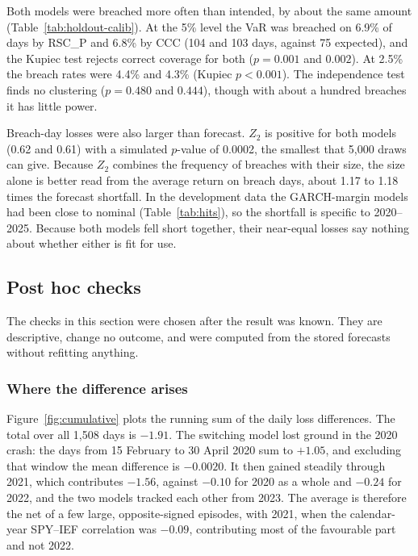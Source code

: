 Both models were breached more often than intended, by about the same amount (Table~\ref{tab:holdout-calib}). At the 5\% level the VaR was breached on 6.9\% of days by RSC\_P and 6.8\% by CCC (104 and 103 days, against 75 expected), and the Kupiec test rejects correct coverage for both ($p=0.001$ and $0.002$). At 2.5\% the breach rates were 4.4\% and 4.3\% (Kupiec $p<0.001$). The independence test finds no clustering ($p=0.480$ and $0.444$), though with about a hundred breaches it has little power.

Breach-day losses were also larger than forecast. $Z_2$ is positive for both models (0.62 and 0.61) with a simulated $p$-value of 0.0002, the smallest that 5,000 draws can give. Because $Z_2$ combines the frequency of breaches with their size, the size alone is better read from the average return on breach days, about 1.17 to 1.18 times the forecast shortfall. In the development data the GARCH-margin models had been close to nominal (Table~\ref{tab:hits}), so the shortfall is specific to 2020--2025. Because both models fell short together, their near-equal losses say nothing about whether either is fit for use.

\subsection{Post hoc checks}\label{sec:holdout-posthoc}

The checks in this section were chosen after the result was known. They are descriptive, change no outcome, and were computed from the stored forecasts without refitting anything.

\subsubsection{Where the difference arises}

Figure~\ref{fig:cumulative} plots the running sum of the daily loss differences. The total over all 1,508 days is $-1.91$. The switching model lost ground in the 2020 crash: the days from 15 February to 30 April 2020 sum to $+1.05$, and excluding that window the mean difference is $-0.0020$. It then gained steadily through 2021, which contributes $-1.56$, against $-0.10$ for 2020 as a whole and $-0.24$ for 2022, and the two models tracked each other from 2023. The average is therefore the net of a few large, opposite-signed episodes, with 2021, when the calendar-year SPY--IEF correlation was $-0.09$, contributing most of the favourable part and not 2022.

